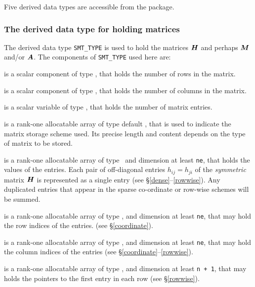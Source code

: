 \documentclass{galahad}
\begin{document}







\galtypes
Five derived data types are accessible from the package.


\subsubsection{The derived data type for holding matrices}\label{typesmt}
The derived data type {\tt SMT\_TYPE} is used to hold the matrices ${\bm{H}}$
and perhaps ${\bm{M}}$ and/or ${\bm{A}}$.
The components of {\tt SMT\_TYPE} used here are:

\begin{description}

 is a scalar component of type \integer,
that holds the number of rows in the matrix.

 is a scalar component of type \integer,
that holds the number of columns in the matrix.

 is a scalar variable of type \integer, that
holds the number of matrix entries.

 is a rank-one allocatable array of type default \character, that
is used to indicate the matrix storage scheme used. Its precise length and
content depends on the type of matrix to be stored.

 is a rank-one allocatable array of type \realdp\,
and dimension at least {\tt ne}, that holds the values of the entries.
Each pair of off-diagonal entries $h_{ij} = h_{ji}$ of the {\em symmetric}
matrix ${\bm{H}}$ is represented as a single entry
(see \S\ref{dense}--\ref{rowwise}).
Any duplicated entries that appear in the sparse
co-ordinate or row-wise schemes will be summed.

 is a rank-one allocatable array of type \integer,
and dimension at least {\tt ne}, that may hold the row indices of the entries.
(see \S\ref{coordinate}).

 is a rank-one allocatable array of type \integer,
and dimension at least {\tt ne}, that may hold the column indices of the entries
(see \S\ref{coordinate}--\ref{rowwise}).

 is a rank-one allocatable array of type \integer,
and dimension at least {\tt n + 1}, that may holds the pointers to
the first entry in each row (see \S\ref{rowwise}).

\end{description}
\end{document}
